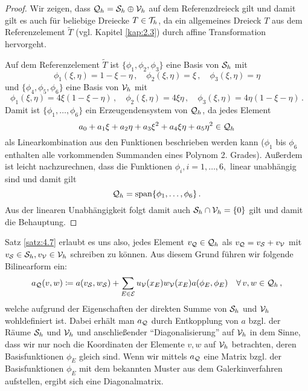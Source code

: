 \begin{proof}
Wir zeigen, dass $\mathcal Q_h = \mathcal S_h \oplus \mathcal V_h$ auf dem Referenzdreieck gilt und damit gilt es auch für beliebige Dreiecke $T \in \mathcal T_h$, da ein allgemeines Dreieck $T$ aus dem Referenzelement $\widetilde T$ (vgl. Kapitel \ref{kap:2.3}) durch affine Transformation hervorgeht.

Auf dem Referenzelement $\widetilde T$ ist $\{\phi_1,\phi_2,\phi_3\}$ eine Basis von $\mathcal S_h$ mit
\[
	\phi_1(\xi,\eta) = 1-\xi-\eta \, , \quad \phi_2(\xi,\eta) = \xi \, , \quad \phi_3(\xi,\eta) = \eta
\]
und $\{\phi_4,\phi_5,\phi_6\}$ eine Basis von $\mathcal V_h$ mit
\[
	\phi_1(\xi,\eta) = 4\xi (1-\xi-\eta) \, , \quad \phi_2(\xi,\eta) = 4\xi\eta \, , \quad \phi_3(\xi,\eta) = 4\eta(1-\xi-\eta) \, .
\]
Damit ist $\{\phi_1,\ldots,\phi_6\}$ ein Erzeugendensystem von $\mathcal Q_h$, da jedes Element
\[
	a_0+a_1\xi+a_2\eta + a_3 \xi^2+ a_4\xi\eta +a_5\eta^2 \in \mathcal Q_h
\]
als Linearkombination aus den Funktionen beschrieben werden kann ($\phi_1$ bis $\phi_6$ enthalten alle vorkommenden Summanden eines Polynom 2. Grades). Außerdem ist leicht nachzurechnen, dass die Funktionen $\phi_i,i = 1,\ldots,6,$ linear unabhängig sind und damit gilt
\[
	\mathcal Q_h = \operatorname{span} \{\phi_1,\ldots,\phi_6\} \, .
\]
Aus der linearen Unabhängigkeit folgt damit auch $\mathcal S_h \cap \mathcal V_h = \{0\}$ gilt und damit die Behauptung.
\end{proof}

Satz \ref{satz:4.7} erlaubt es uns also, jedes Element $v_{\mathcal Q} \in \mathcal Q_h$  als $v_{\mathcal Q} = v_{\mathcal S} + v_{\mathcal V}$ mit $v_{\mathcal S} \in \mathcal S_h, v_{\mathcal V}\in \mathcal V_h$ schreiben zu können. Aus diesem Grund führen wir folgende Bilinearform ein:
\begin{align*}
	a_{\mathcal Q} (v,w) \coloneqq a(v_{\mathcal S},w_{\mathcal S}) + \sum_{E \in \mathcal E} u_{\mathcal V}(x_E) w_{\mathcal V}(x_E) a(\phi_E,\phi_E) \quad \forall \, v,w \in \mathcal Q_h \, ,
\end{align*}
welche aufgrund der Eigenschaften der direkten Summe von $\mathcal S_h$ und $\mathcal V_h$ wohldefiniert ist. Dabei erhält man $a_{\mathcal Q}$ durch Entkopplung von $a$ bzgl. der Räume $\mathcal S_h$ und $\mathcal V_h$ und anschließender "`Diagonalisierung"' auf $\mathcal V_h$ in dem Sinne, dass wir nur noch die Koordinaten der Elemente $v,w$ auf $\mathcal V_h$ betrachten, deren Basisfunktionen $\phi_E$ gleich sind. Wenn wir mittels $a_{\mathcal Q}$ eine Matrix bzgl. der Basisfunktionen $\phi_E$ mit dem bekannten Muster aus dem Galerkinverfahren aufstellen, ergibt sich eine Diagonalmatrix.


